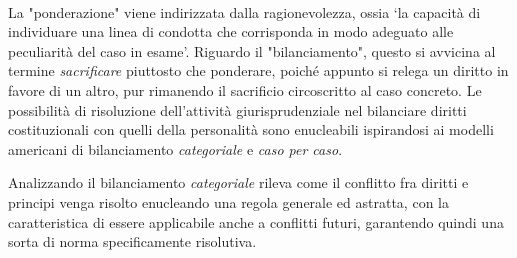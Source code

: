 \\La "ponderazione"
viene indirizzata dalla ragionevolezza, ossia ‘la capacità di individuare una linea di condotta che corrisponda in modo adeguato alle peculiarità del caso in esame’.
Riguardo il "bilanciamento", questo si avvicina al termine \textit{sacrificare} piuttosto che ponderare, poiché appunto si relega un diritto in favore di un altro, pur rimanendo  il sacrificio circoscritto al caso concreto.
Le possibilità di risoluzione dell'attività giurisprudenziale nel bilanciare diritti costituzionali con quelli della personalità sono enucleabili ispirandosi ai modelli americani di bilanciamento \textit{categoriale} e \textit{caso per caso}.

Analizzando il bilanciamento \textit{categoriale} rileva come il conflitto fra diritti e principi venga risolto enucleando una regola generale ed astratta, con la caratteristica di essere applicabile anche a conflitti futuri, garantendo quindi una sorta di norma specificamente risolutiva.

